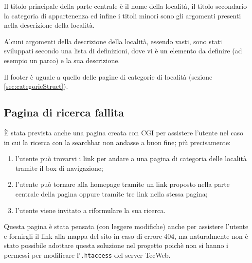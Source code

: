 Il titolo principale della parte centrale è il nome della località, il titolo secondario la categoria di appartenenza ed infine i titoli minori sono gli argomenti presenti nella descrizione della località.

Alcuni argomenti della descrizione della località, essendo vasti, sono stati sviluppati secondo una lista di definizioni, dove vi è un elemento da definire (ad esempio un parco) e la sua descrizione.

Il footer è uguale a quello delle pagine di categorie di località (sezione \ref{sec:categorieStruct}).

\subsection{Pagina di ricerca fallita}
È stata prevista anche una pagina creata con CGI per assistere l'utente nel caso in cui la ricerca con la searchbar non andasse a buon fine; più precisamente:
\begin{enumerate}
\item l'utente può trovarvi i link per andare a una pagina di categoria delle località tramite il box di navigazione;
\item l'utente può tornare alla homepage tramite un link proposto nella parte centrale della pagina oppure tramite tre link nella stessa pagina;
\item l'utente viene invitato a riformulare la sua ricerca.
\end{enumerate}

Questa pagina è stata pensata (con leggere modifiche) anche per assistere l'utente e fornirgli il link alla mappa del sito in caso di errore 404, ma naturalmente non è stato possibile adottare questa soluzione nel progetto poichè non si hanno i permessi per modificare l'\texttt{.htaccess} del server TecWeb.
